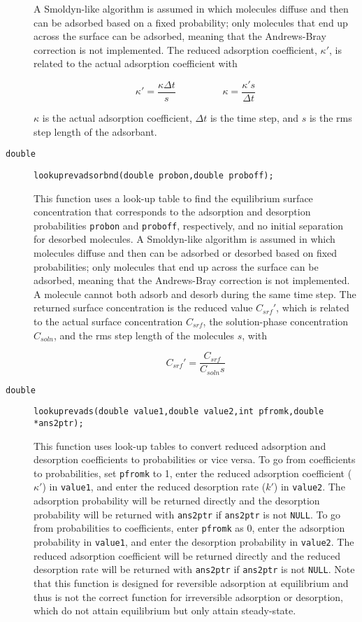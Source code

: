 \documentclass[11pt]{article}
\newcommand {\ttt} {\texttt}
\begin{document}
\begin{description}
A Smoldyn-like algorithm is assumed in which molecules diffuse and then can be adsorbed based on a fixed probability; only molecules that end up across the surface can be adsorbed, meaning that the Andrews-Bray correction is not implemented. The reduced adsorption coefficient, $\kappa'$, is related to the actual adsorption coefficient with

$$\kappa' = \frac{\kappa \Delta t}{s}
\hspace{2cm}
\kappa = \frac{\kappa' s}{\Delta t}$$		 	 

$\kappa$ is the actual adsorption coefficient, $\Delta t$ is the time step, and $s$ is the rms step length of the adsorbant.

\item[\ttt{double}]
\ttt{lookuprevadsorbnd(double probon,double proboff);}

This function uses a look-up table to find the equilibrium surface concentration that corresponds to the adsorption and desorption probabilities \ttt{probon} and \ttt{proboff}, respectively, and no initial separation for desorbed molecules. A Smoldyn-like algorithm is assumed in which molecules diffuse and then can be adsorbed or desorbed based on fixed probabilities; only molecules that end up across the surface can be adsorbed, meaning that the Andrews-Bray correction is not implemented. A molecule cannot both adsorb and desorb during the same time step. The returned surface concentration is the reduced value $C_{srf}'$, which is related to the actual surface concentration $C_{srf}$, the solution-phase concentration $C_{soln}$, and the rms step length of the molecules $s$, with

$$C_{srf}' = \frac{C_{srf}}{C_{soln} s}$$		 


\item[\ttt{double}]
\ttt{lookuprevads(double value1,double value2,int pfromk,double *ans2ptr);}

This function uses look-up tables to convert reduced adsorption and desorption coefficients to probabilities or vice versa. To go from coefficients to probabilities, set \ttt{pfromk} to 1, enter the reduced adsorption coefficient ($\kappa'$) in \ttt{value1}, and enter the reduced desorption rate ($k'$) in \ttt{value2}. The adsorption probability will be returned directly and the desorption probability will be returned with \ttt{ans2ptr} if \ttt{ans2ptr} is not \ttt{NULL}. To go from probabilities to coefficients, enter \ttt{pfromk} as 0, enter the adsorption probability in \ttt{value1}, and enter the desorption probability in \ttt{value2}. The reduced adsorption coefficient will be returned directly and the reduced desorption rate will be returned with \ttt{ans2ptr} if \ttt{ans2ptr} is not \ttt{NULL}. Note that this function is designed for reversible adsorption at equilibrium and thus is not the correct function for irreversible adsorption or desorption, which do not attain equilibrium but only attain steady-state.



\end{description}
\end{document}
